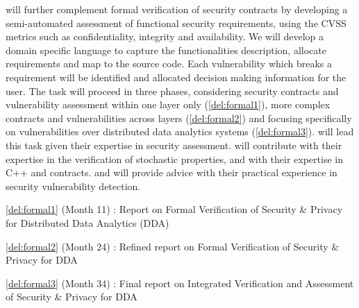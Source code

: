 \begin{Workpackage}{\thewpno}
\begin{Task}
\theTask{} will further complement formal verification of security contracts by developing a semi-automated assessment of functional security requirements, using the CVSS metrics such as confidentiality, integrity and availability. We will develop a domain specific language to capture the functionalities description, allocate requirements and map to the source code. Each vulnerability which breaks a requirement will be identified and allocated decision making information for the user.
The task will proceed in three phases, considering security contracts and vulnerability assessment within one layer only (\ref{del:formal1}), more complex contracts and vulnerabilities across layers (\ref{del:formal2}) and focusing specifically on vulnerabilities over distributed data analytics systems (\ref{del:formal3}).
\YAGshort will lead this task given their expertise in security assessment. \SA will contribute with their expertise in the verification of stochastic properties, and \UCM with their expertise in C++ and contracts. \IBMshort and \SOPRAshort will provide advice with their practical experience in security vulnerability detection.

\end{Task}


\begin{WPDeliverables}
  \begin{compactitem}
  \item \ref{del:formal1} (Month 11) : Report on Formal Verification of Security \& Privacy for Distributed Data Analytics (DDA)
\item \ref{del:formal2} (Month 24) : 
Refined report on Formal Verification of Security \& Privacy for DDA 
\item \ref{del:formal3} (Month 34) : Final report on Integrated Verification and Assessment of Security \& Privacy for DDA 
\end{compactitem}
\end{WPDeliverables}
\end{Workpackage}
